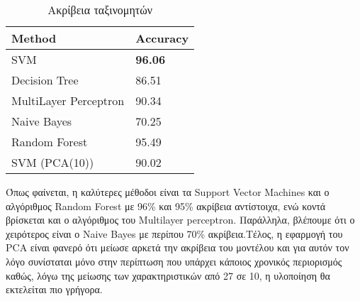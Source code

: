 \begin{table}[H]
\begin{tabular}{|l|l|}
\hline
\textbf{Method}             & \textbf{Αccuracy}\\\hline
SVM                         & \textbf{96.06}   \\\hline
Decision Tree               & 86.51 \\\hline
MultiLayer Perceptron       & 90.34 \\\hline
Naive Bayes                 & 70.25 \\\hline 
Random Forest               & 95.49 \\\hline
SVM (PCA(10))               & 90.02 \\\hline
\end{tabular}
\caption{Ακρίβεια ταξινομητών}
\end{table}

Όπως φαίνεται, η καλύτερες μέθοδοι είναι τα Support Vector Machines και ο αλγόριθμος Random Forest με 96\% και 95\% ακρίβεια αντίστοιχα, ενώ  κοντά βρίσκεται και ο αλγόριθμος του Multilayer perceptron. Παράλληλα, βλέπουμε ότι ο χειρότερος είναι ο Naive Bayes με περίπου 70\% ακρίβεια.Τέλος, η εφαρμογή του PCA είναι φανερό ότι μείωσε αρκετά την ακρίβεια του μοντέλου και για αυτόν τον λόγο συνίσταται μόνο στην περίπτωση που υπάρχει κάποιος χρονικός περιορισμός καθώς, λόγω της μείωσης των χαρακτηριστικών από 27 σε 10, η υλοποίηση θα εκτελείται πιο γρήγορα.  


